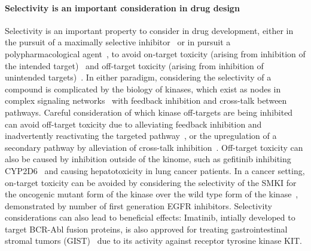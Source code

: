 \documentclass[9pt,lineno]{elife-modified} %
\begin{document}
\paragraph{Selectivity is an important consideration in drug design}
Selectivity is an important property to consider in drug development, either in the pursuit of a maximally selective inhibitor~\citep{Zhang2009-il,Huggins2012-hr} or in pursuit a polypharmacological agent~\citep{Fan2007-hm,Apsel2008-it,Knight:Nat.Rev.Cancer:2010,Hopkins2006-qu,Hopkins2008-ij}, to avoid on-target toxicity (arising from inhibition of the intended target)~\citep{Rudmann2013-hi}  and off-target toxicity (arising from inhibition of unintended targets)~\citep{Kijima2011-xs,Liu2014-yi}. In either paradigm, considering the selectivity of a compound is complicated by the biology of kinases, which exist as nodes in complex signaling networks~\citep{Mendoza2011-bj,Tricker2015-xx} with feedback inhibition and cross-talk between pathways. Careful consideration of which kinase off-targets are being inhibited can avoid off-target toxicity due to alleviating feedback inhibition and inadvertently reactivating the targeted pathway~\citep{Mendoza2011-bj,Tricker2015-xx}, or the upregulation of a secondary pathway by alleviation of cross-talk inhibition~\citep{Bailey2014-pd,Chandarlapaty:CancerCell:2011}. Off-target toxicity can also be caused by inhibition outside of the kinome, such as gefitinib inhibiting CYP2D6~\citep{Kijima2011-xs} and causing hepatotoxicity in lung cancer patients. In a cancer setting, on-target toxicity can be avoided by considering the selectivity of the SMKI for the oncogenic mutant form of the kinase over the wild type form of the kinase~\citep{Pao2004-kx,Kim2012-mo,Juchum:DrugResist.Updat.:2015}, demonstrated by number of first generation EGFR inhibitors. Selectivity considerations can also lead to beneficial effects: Imatinib, intially developed to target BCR-Abl fusion proteins, is also approved for treating gastrointestinal stromal tumors (GIST)~\citep{Din2008-ag} due to its activity against receptor tyrosine kinase KIT. 
\end{document}
